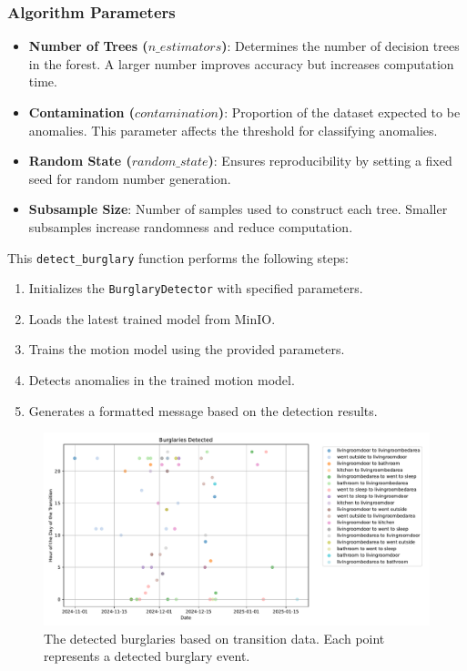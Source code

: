 \documentclass[A4,10pt]{article}
\begin{document}
\subsubsection{Algorithm Parameters}
\begin{itemize}[noitemsep, topsep=0pt]
    \item \textbf{Number of Trees ($n\_estimators$)}: Determines the number of decision trees in the forest. A larger number improves accuracy but increases computation time.
    \item \textbf{Contamination ($contamination$)}: Proportion of the dataset expected to be anomalies. This parameter affects the threshold for classifying anomalies.
    \item \textbf{Random State ($random\_state$)}: Ensures reproducibility by setting a fixed seed for random number generation.
    \item \textbf{Subsample Size}: Number of samples used to construct each tree. Smaller subsamples increase randomness and reduce computation.
\end{itemize}

This \texttt{detect\_burglary} function performs the following steps:
\begin{enumerate}
    \item Initializes the \texttt{BurglaryDetector} with specified parameters.
    \item Loads the latest trained model from MinIO.
    \item Trains the motion model using the provided parameters.
    \item Detects anomalies in the trained motion model.
    \item Generates a formatted message based on the detection results.
\end{enumerate}

\begin{figure}[H]
	\centering
	\includegraphics[width=1.1\textwidth]{burglaries_detected.pdf}
	\caption{The detected burglaries based on transition data. Each point represents a detected burglary event.}
	\label{fig:hub}
\end{figure}
\end{document}
